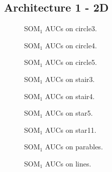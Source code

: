 \subsection{Architecture 1 - 2D}
\begin{figure}[h!]
         \centering
         
         \caption{SOM$_1$ AUCs on circle3.}
\end{figure}
\begin{figure}[h!]
         \centering
         
         \caption{SOM$_1$ AUCs on circle4.}
\end{figure}
\begin{figure}[h!]
         \centering
         
         \caption{SOM$_1$ AUCs on circle5.}
\end{figure}
\begin{figure}[h!]
         \centering
         
         \caption{SOM$_1$ AUCs on stair3.}
\end{figure}
\begin{figure}[h!]
         \centering
         
         \caption{SOM$_1$ AUCs on stair4.}
\end{figure}
\begin{figure}[h!]
         \centering
         
         \caption{SOM$_1$ AUCs on star5.}
\end{figure}
\begin{figure}[h!]
         \centering
         
         \caption{SOM$_1$ AUCs on star11.}
\end{figure}
\begin{figure}[h!]
         \centering
         
         \caption{SOM$_1$ AUCs on parables.}
\end{figure}
\begin{figure}[h!]
         \centering
         
         \caption{SOM$_1$ AUCs on lines.}
\end{figure}
\clearpage

